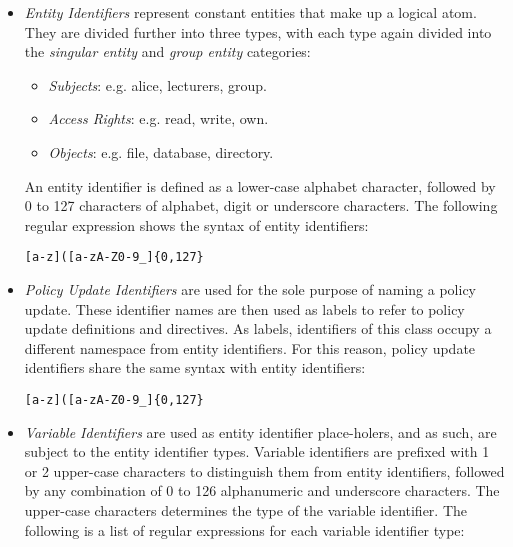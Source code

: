 \documentclass[10pt, twocolumn]{article}
\begin{document}
          \begin{itemize}
            \item
              {\em Entity Identifiers} represent constant entities that make up
              a logical atom. They are divided further into three types, with
              each type again divided into the {\em singular entity} and
              {\em group entity} categories:

              \begin{itemize}
                \item
                  {\em Subjects}: e.g. alice, lecturers, group.
                \item
                  {\em Access Rights}: e.g. read, write, own.
                \item
                  {\em Objects}: e.g. file, database, directory.
              \end{itemize}

              An entity identifier is defined as a lower-case alphabet
              character, followed by 0 to 127 characters of alphabet, digit or
              underscore characters. The following regular expression shows the
              syntax of entity identifiers:

              \begin{verbatim}[a-z]([a-zA-Z0-9_]{0,127}\end{verbatim}

            \item
              {\em Policy Update Identifiers} are used for the sole purpose of
              naming a policy update. These identifier names are then used as
              labels to refer to policy update definitions and directives. As
              labels, identifiers of this class occupy a different namespace
              from entity identifiers. For this reason, policy update
              identifiers share the same syntax with entity identifiers:

              \begin{verbatim}[a-z]([a-zA-Z0-9_]{0,127}\end{verbatim}

            \item
              {\em Variable Identifiers} are used as entity identifier
              place-holers, and as such, are subject to the entity identifier
              types. Variable identifiers are prefixed with 1 or 2 upper-case
              characters to distinguish them from entity identifiers, followed
              by any combination of 0 to 126 alphanumeric and underscore
              characters. The upper-case characters determines the type of the
              variable identifier. The following is a list of regular
              expressions for each variable identifier type:


\end{itemize}
\end{document}
